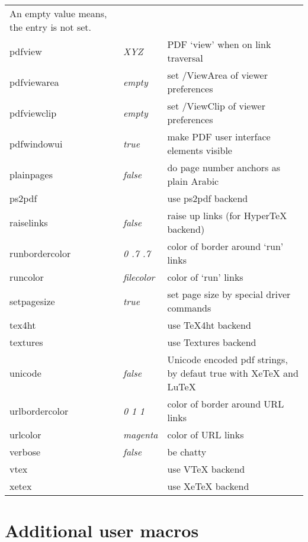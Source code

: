 \documentclass[pdftex]{article}
\begin{document}
\begin{longtable}{@{}>{\ttfamily}llp{7cm}@{}}
  An empty value means, the entry is not set.\\
pdfview            & \textit{XYZ}           & PDF `view' when on link traversal \\
pdfviewarea        & \textit{empty}         & set /ViewArea of viewer preferences \\
pdfviewclip        & \textit{empty}         & set /ViewClip of viewer preferences \\
pdfwindowui        & \textit{true}          & make PDF user interface elements visible \\
plainpages         & \textit{false}         & do page number anchors as plain Arabic \\
ps2pdf             &                        & use \textsf{ps2pdf} backend \\
raiselinks         & \textit{false}         & raise up links (for \textsf{Hyper\TeX} backend) \\
runbordercolor     & \textit{0 .7 .7}       & color of border around `run' links \\
runcolor           & \textit{filecolor}     & color of `run' links\\
setpagesize        & \textit{true}          & set page size by special driver commands \\
tex4ht             &                        & use \textsf{\TeX4ht} backend \\
textures           &                        & use \textsf{Textures} backend \\
unicode            & \textit{false}         & Unicode encoded pdf strings, by defaut true with \textsf{Xe\TeX} and \textsf{Lu\TeX} \\
urlbordercolor     & \textit{0 1 1}         & color of border around URL links \\
urlcolor           & \textit{magenta}       & color of URL links \\
verbose            & \textit{false}         & be chatty \\
vtex               &                        & use \textsf{VTeX} backend\\
xetex              &                        & use \textsf{Xe\TeX} backend\\
\end{longtable}

\section{Additional user macros}
\end{document}
